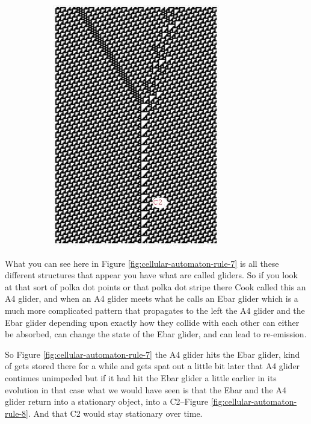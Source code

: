 \documentclass[]{article}
\begin{document}
\begin{figure}[H]
\begin{subfigure}[t]{0.45\textwidth}
		\includegraphics[width=\textwidth]{cellular-automaton-rule-8}
	\end{subfigure}
\end{figure}
What you can see here in Figure \ref{fig:cellular-automaton-rule-7} is all these different structures that appear you have what are called gliders.
So if you look at that sort of polka dot points or that polka dot stripe there Cook called this an A4 glider, and when an A4 glider meets what he calls an Ebar glider
which is a much more complicated pattern that propagates to the left the A4 glider and the Ebar glider depending upon exactly how they collide with each other
can either be absorbed, can change the state of the Ebar glider, and can lead to re-emission.

So Figure \ref{fig:cellular-automaton-rule-7} the A4 glider hits the Ebar glider,
kind of gets stored there for a while and gets spat out a little bit later
that A4 glider continues unimpeded but if it had hit the Ebar glider a little earlier
in its evolution in that case what we would have seen is that the Ebar and the A4 glider return into a stationary object, into a C2--Figure \ref{fig:cellular-automaton-rule-8}. And that C2 would stay stationary over time.
\end{document}
